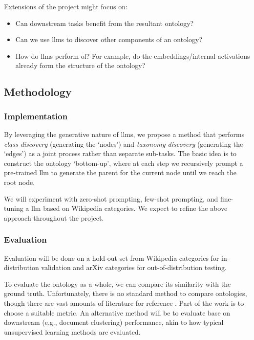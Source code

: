 Extensions of the project might focus on:
\begin{itemize}
    \item Can downstream tasks benefit from the resultant ontology?
    \item Can we use \gls{llm}s to discover other components of an ontology?
    \item How do \gls{llm}s perform \gls{ol}? For example, do the embeddings/internal activations already form the structure of the ontology?
\end{itemize}

\subsection*{Methodology}

\subsubsection*{Implementation}

By leveraging the generative nature of \gls{llm}s, we propose a method that performs \emph{class discovery} (generating the `nodes') and \emph{taxonomy discovery} (generating the `edges') as a joint process rather than separate sub-tasks. The basic idea is to construct the ontology `bottom-up', where at each step we recursively prompt a pre-trained \gls{llm} to generate the parent for the current node until we reach the root node.

We will experiment with zero-shot prompting, few-shot prompting, and fine-tuning a \gls{llm} based on Wikipedia categories. We expect to refine the above approach throughout the project.

\subsubsection*{Evaluation}

Evaluation will be done on a hold-out set from Wikipedia categories for in-distribution validation and arXiv categories for out-of-distribution testing.

To evaluate the ontology as a whole, we can compare its similarity with the ground truth. Unfortunately, there is no standard method to compare ontologies, though there are vast amounts of literature for reference \citep{ontology-matching}. Part of the work is to choose a suitable metric. An alternative method will be to evaluate base on downstream (e.g., document clustering) performance, akin to how typical unsupervised learning methods are evaluated.

